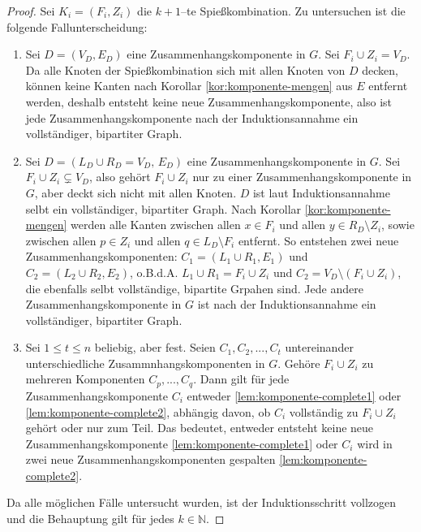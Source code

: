 \begin{proof}
Sei $K_i = (F_i, Z_i)$ die $k+1$--te Spießkombination.
Zu untersuchen ist die folgende Fallunterscheidung:
\begin{enumerate}[label={\upshape(\roman*)}]
  \item Sei $D = (V_D, E_D)$ eine Zusammenhangskomponente in $G$. Sei $F_i \cup Z_i = V_D$.
  Da alle Knoten der Spießkombination sich mit allen Knoten von $D$ decken,
  können keine Kanten nach Korollar \ref{kor:komponente-mengen} aus $E$ entfernt werden, deshalb
  entsteht keine neue Zusammenhangskomponente, also ist jede Zusammenhangskomponente
  nach der Induktionsannahme ein vollständiger, bipartiter Graph.\label{lem:komponente-complete1} 
  \item Sei $D = (L_D \cup R_D = V_D,\, E_D)$ eine Zusammenhangskomponente in $G$.
  Sei $F_i \cup Z_i \subsetneq V_D$, also gehört $F_i \cup Z_i$ nur zu einer
  Zusammenhangskomponente in $G$, aber deckt sich nicht mit allen Knoten.
  $D$ ist laut Induktionsannahme selbt ein vollständiger, bipartiter Graph.
  Nach Korollar \ref{kor:komponente-mengen} werden alle Kanten zwischen 
  allen $x \in F_i$ und allen $y \in R_D \setminus Z_i$,
  sowie zwischen allen $p \in Z_i$ und allen $q \in L_D \setminus F_i$ entfernt.
  So entstehen zwei neue Zusammenhangskomponenten: $C_1 = (L_1 \cup R_1, E_1)$ und $C_2 = (L_2 \cup R_2, E_2)$,
  o.B.d.A. $L_1 \cup R_1 = F_i \cup Z_i$ und $C_2 = V_D \setminus (F_i \cup Z_i)$, die ebenfalls selbt 
  vollständige, bipartite Grpahen sind.
  Jede andere Zusammenhangskomponente in $G$ ist
  nach der Induktionsannahme ein vollständiger, bipartiter Graph.\label{lem:komponente-complete2}

  \item Sei $1 \leqslant t \leqslant n$ beliebig, aber fest.
  Seien $C_1, C_2, ..., C_t$ untereinander unterschiedliche Zusammnhangskomponenten in $G$.
  Gehöre $F_i \cup Z_i$ zu mehreren Komponenten $C_p, ..., C_q$.
  Dann gilt für jede Zusammenhangskomponente $C_i$ entweder \ref{lem:komponente-complete1} 
  oder \ref{lem:komponente-complete2}, abhängig davon, ob $C_i$ vollständig zu $F_i \cup Z_i$
  gehört oder nur zum Teil. Das bedeutet, entweder entsteht keine neue Zusammenhangskomponente 
  \ref{lem:komponente-complete1} oder $C_i$ wird in zwei neue Zusammenhangskomponenten gespalten
  \ref{lem:komponente-complete2}.
\end{enumerate}

Da alle möglichen Fälle untersucht wurden, ist der Induktionsschritt vollzogen und die Behauptung gilt für jedes
$k \in \mathbb{N}$.
\end{proof}
